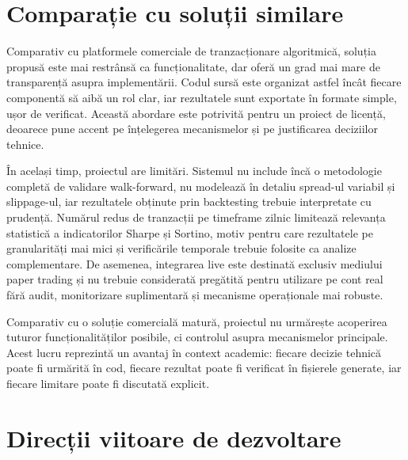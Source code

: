 \section{Comparație cu soluții similare}
\label{cap:cap5:comparatie}

Comparativ cu platformele comerciale de tranzacționare algoritmică, soluția propusă este mai restrânsă ca funcționalitate, dar oferă un grad mai mare de transparență asupra implementării. Codul sursă este organizat astfel încât fiecare componentă să aibă un rol clar, iar rezultatele sunt exportate în formate simple, ușor de verificat. Această abordare este potrivită pentru un proiect de licență, deoarece pune accent pe înțelegerea mecanismelor și pe justificarea deciziilor tehnice.

În același timp, proiectul are limitări. Sistemul nu include încă o metodologie completă de validare walk-forward, nu modelează în detaliu spread-ul variabil și slippage-ul, iar rezultatele obținute prin backtesting trebuie interpretate cu prudență. Numărul redus de tranzacții pe timeframe zilnic limitează relevanța statistică a indicatorilor Sharpe și Sortino, motiv pentru care rezultatele pe granularități mai mici și verificările temporale trebuie folosite ca analize complementare. De asemenea, integrarea live este destinată exclusiv mediului paper trading și nu trebuie considerată pregătită pentru utilizare pe cont real fără audit, monitorizare suplimentară și mecanisme operaționale mai robuste.

Comparativ cu o soluție comercială matură, proiectul nu urmărește acoperirea tuturor funcționalităților posibile, ci controlul asupra mecanismelor principale. Acest lucru reprezintă un avantaj în context academic: fiecare decizie tehnică poate fi urmărită în cod, fiecare rezultat poate fi verificat în fișierele generate, iar fiecare limitare poate fi discutată explicit.

\section{Direcții viitoare de dezvoltare}
\label{cap:cap5:directii-viitoare}

